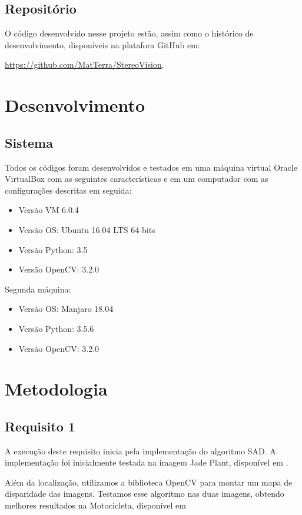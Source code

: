 \documentclass{bmvc2k}
\begin{document}
\subsection{Repositório}
O código desenvolvido nesse projeto estão, assim como o histórico de desenvolvimento, disponíveis na platafora GitHub em:


\url{https://github.com/MatTerra/StereoVision}.

\section{Desenvolvimento}
\label{sec:Desenvolvimento}
\subsection{Sistema}
Todos os códigos foram desenvolvidos e testados em uma máquina virtual Oracle VirtualBox \cite{VM} com as seguintes características e em um computador com as configurações descritas em seguida:
\begin{itemize}
    \item Versão VM 6.0.4
    \item Versão OS: Ubuntu 16.04 LTS 64-bits
    \item Versão Python: 3.5
    \item Versão OpenCV: 3.2.0
\end{itemize}

Segunda máquina:
\begin{itemize}
    \item Versão OS: Manjaro 18.04
    \item Versão Python: 3.5.6
    \item Versão OpenCV: 3.2.0
\end{itemize}

\section{Metodologia}
\label{sec:Metodologia}
\subsection{Requisito 1}
A execução deste requisito inicia pela implementação do algoritmo SAD. A implementação foi inicialmente testada na imagem Jade Plant, disponível em \cite{JadePlant}. 

Além da localização, utilizamos a biblioteca OpenCV para montar um mapa de disparidade das imagens. Testamos esse algoritmo nas duas imagens, obtendo melhores resultados na Motocicleta, disponível em\cite{Motorcycle}
 
\end{document}
